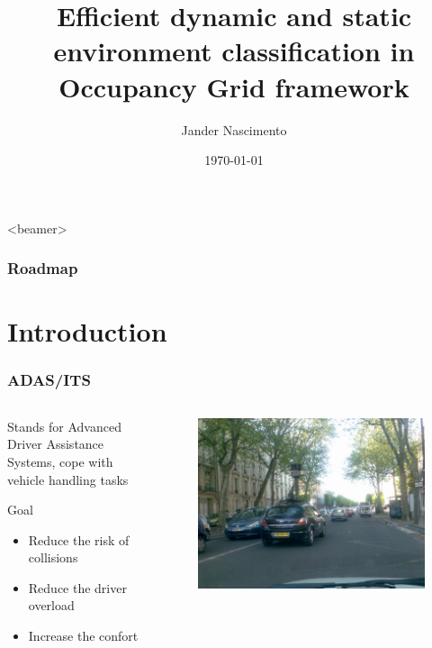 \documentclass{beamer}
\title[Fast classification]{Efficient dynamic and static environment classification in Occupancy Grid framework}
\author{Jander Nascimento}
\institute{Université Joseph Fourier / INRIA}
\date{\today}
\begin{document}
\begin{frame}
\titlepage
\end{frame}

{
  \begin{frame}<beamer>
    \frametitle{Roadmap}
    \tableofcontents%
  \end{frame}
}

	\section{Introduction}
	
	\begin{frame}
		\frametitle{ADAS/ITS}
		
		\begin{columns}[t]
		  \begin{column}{5cm}
			\begin{exampleblock}{Stands for}	
				Advanced Driver Assistance Systems, cope with vehicle handling tasks
			\end{exampleblock}		
			\begin{block}{Goal}
				\begin{itemize}
				\item Reduce the risk of collisions
				\item Reduce the driver overload
				\item Increase the confort
				\end{itemize}
			\end{block}
		  \end{column}
		  
		  \begin{column}{5cm}
		  \begin{figure}[h]
			\center
			\includegraphics[scale=0.15]{img/fig:street:urban}
		  \end{figure}   
		  \end{column}
		 \end{columns}

	\end{frame}	
\end{document}
